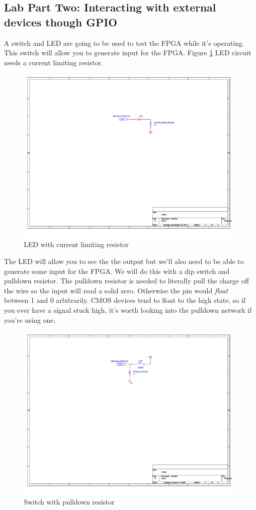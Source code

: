     \subsection{Lab Part Two: Interacting with external devices though GPIO}
      A switch and LED are going to be used to test the FPGA while it's operating. This switch will allow you to generate input for the FPGA. Figure \ref{LEDCircuit} LED circuit needs a current limiting resistor.
      \begin{figure}[htpb]
        \includegraphics[width=.48\textwidth]{Schematics/LED.pdf}
        \caption{LED with current limiting resistor}
        \label{LEDCircuit}
      \end{figure}
      The LED will allow you to see the the output but we'll also need to be able to generate some input for the FPGA. We will do this with a dip switch and pulldown resistor. The pulldown resistor is needed to literally pull the charge off the wire so the input will read a solid zero. Otherwise the pin would {\it float} between 1 and 0 arbitrarily. CMOS devices tend to float to the high state, so if you ever have a signal stuck high, it's worth looking into the pulldown network if you're using one.

      \begin{figure}[htpb]
        \includegraphics[width=.38\textwidth]{Schematics/SwitchCircuit.pdf}
        \caption{Switch with pulldown resistor}
        \label{swPulldown}
      \end{figure}

